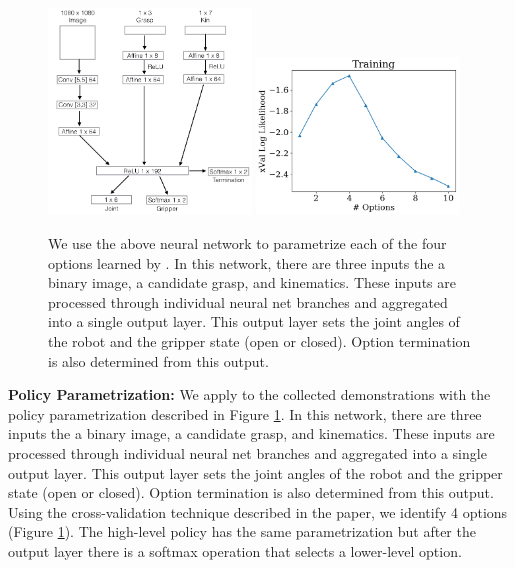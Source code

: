 \begin{figure} [t]
    \includegraphics[width=0.48\textwidth]{ddco-experiments/net.png}
    \includegraphics[width=0.48\textwidth]{ddco-experiments/exp6-1.png}
    \caption{We use the above neural network to parametrize each of the four options learned by \alg. In this network, there are three inputs the a binary image, a candidate grasp, and kinematics. These inputs are processed through individual neural net branches and aggregated into a single output layer. This output layer sets the joint angles of the robot and the gripper state (open or closed). Option termination is also determined from this output. \label{fig:dvrknet}}
\end{figure}

\vspace{0.25em} \noindent \textbf{Policy Parametrization: } We apply \alg to the collected demonstrations with the policy parametrization described in Figure \ref{fig:dvrknet}. In this network, there are three inputs the a binary image, a candidate grasp, and kinematics. These inputs are processed through individual neural net branches and aggregated into a single output layer. This output layer sets the joint angles of the robot and the gripper state (open or closed). Option termination is also determined from this output. Using the cross-validation technique described in the paper, we identify 4 options (Figure \ref{fig:dvrknet}). The high-level policy has the same parametrization but after the output layer there is a softmax operation that selects a lower-level option.  

